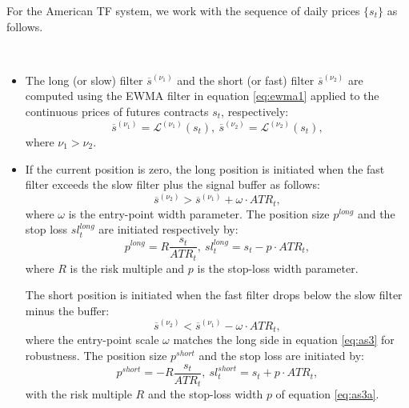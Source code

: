 \documentclass[hidelinks]{siamonline250211}
\begin{document}
For the American TF system, we work with the sequence of daily prices $\{s_{t}\}$ as follows.


\begin{definition}\label{as:am} ~
	
	\begin{itemize}
		
		\item The long (or slow) filter $\overline{s}^{(\nu_{1})}$ and the short (or fast) filter $\overline{s}^{(\nu_{2})}$ are computed using the EWMA filter in equation \eqref{eq:ewma1} applied to the continuous prices of futures contracts $s_{t}$, respectively:
		\begin{equation} \label{eq:as1} 
			\overline{s}^{(\nu_{1})} = \mathcal{L}^{(\nu_{1})} (s_{t}), \ \overline{s}^{(\nu_{2})} = \mathcal{L}^{(\nu_{2})} (s_{t}),
		\end{equation}
		where $\nu_{1} > \nu_{2}$.
		
		
		\item If the current position is zero, the long position is initiated when the fast filter exceeds the slow filter plus the signal buffer as follows:
		\begin{equation} \label{eq:as3} 
			\overline{s}^{(\nu_{2})} > \overline{s}^{(\nu_{1})} + \omega \cdot ATR_{t},
		\end{equation}
		where $\omega$ is the entry-point width parameter. The position size $p^{long}$ and the stop loss $sl^{long}_{t}$ are initiated respectively by:
		\begin{equation} \label{eq:as3a} 
			p^{long} = R \frac{s_{t}}{ATR_{t}}, \  sl^{long}_{t} = s_{t} - p \cdot ATR_{t},
		\end{equation}
		where $R$ is the risk multiple and $p$ is the stop-loss width parameter.
		
		
		The short position is initiated when the fast filter drops below the slow filter minus the buffer:
		\begin{equation} \label{eq:as4} 
			\overline{s}^{(\nu_{2})} < \overline{s}^{(\nu_{1})} - \omega \cdot ATR_{t},
		\end{equation}
		where the entry-point scale $\omega$ matches the long side in equation \eqref{eq:as3} for robustness. The position size $p^{short}$ and the stop loss are initiated by:
		\begin{equation} \label{eq:as4a} 
			p^{short} =  - R \frac{s_{t}}{ATR_{t}}, \  sl^{short}_{t} = s_{t} + p \cdot ATR_{t},
		\end{equation}
		with the risk multiple $R$ and the stop-loss width $p$ of equation \eqref{eq:as3a}.
		

\end{itemize}
\end{definition}
\end{document}
